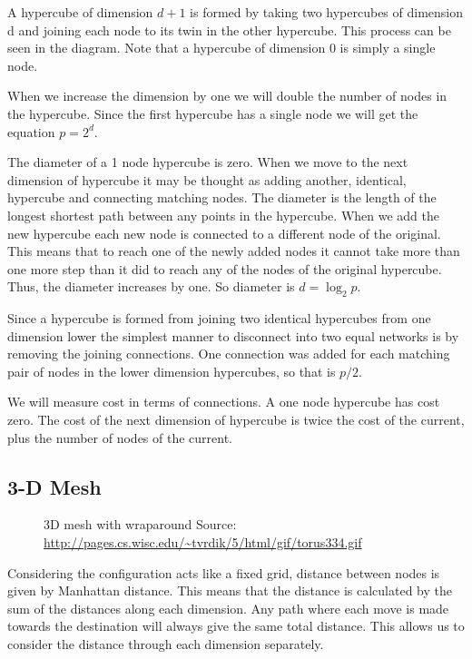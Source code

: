 \documentclass[11pt]{article}
\begin{document}
A hypercube of dimension $d+1$ is formed by taking two hypercubes of dimension d and joining each node to its twin in the other hypercube. This process can be seen in the diagram. Note that a hypercube of dimension 0 is simply a single node.

When we increase the dimension by one we will double the number of nodes in the hypercube. Since the first hypercube has a single node we will get the equation $p = 2^d$.

The diameter of a 1 node hypercube is zero. When we move to the next dimension of hypercube it may be thought as adding another, identical, hypercube and connecting matching nodes. The diameter is the length of the longest shortest path between any points in the hypercube. When we add the new hypercube each new node is connected to a different node of the original. This means that to reach one of the newly added nodes it cannot take more than one more step than it did to reach any of the nodes of the original hypercube. Thus, the diameter increases by one. So diameter is $d = \log_2 p$.

Since a hypercube is formed from joining two identical hypercubes from one dimension lower the simplest manner to disconnect into two equal networks is by removing the joining connections. One connection was added for each matching pair of nodes in the lower dimension hypercubes, so that is $p/2$.

We will measure cost in terms of connections. A one node hypercube has cost zero. The cost of the next dimension of hypercube is twice the cost of the current, plus the number of nodes of the current.

\subsection{3-D Mesh}

\begin{figure}
\caption{3D mesh with wraparound \newline Source: \protect\url{http://pages.cs.wisc.edu/~tvrdik/5/html/gif/torus334.gif}}
\end{figure}

Considering the configuration acts like a fixed grid, distance between nodes is given by Manhattan distance. This means that the distance is calculated by the sum of the distances along each dimension. Any path where each move is made towards the destination will always give the same total distance. This allows us to consider the distance through each dimension separately.
\end{document}
